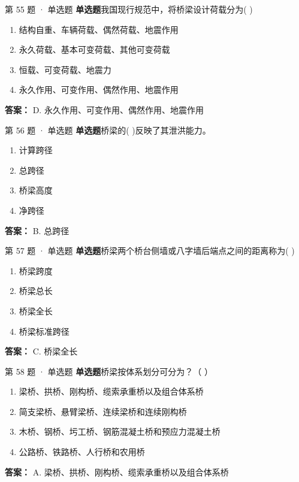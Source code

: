 \documentclass[UTF8,zihao=-4,openany]{ctexbook}
\newenvironment{choices}{\begin{enumerate}[label=\Alph*.,leftmargin=9mm,labelsep=3mm,itemsep=2pt,topsep=4pt]}{\end{enumerate}}
\newcommand{\qtype}[1]{\textcolor{brand}{\sffamily\bfseries #1}}
\begin{document}
\begin{questionbox}{第 55 题 · 单选题}
\qtype{单选题}\quad 我国现行规范中，将桥梁设计荷载分为( )
\begin{choices}
\item 结构自重、车辆荷载、偶然荷载、地震作用
\item 永久荷载、基本可变荷载、其他可变荷载
\item 恒载、可变荷载、地震力
\item 永久作用、可变作用、偶然作用、地震作用
\end{choices}
\begin{answerbox}
\textbf{答案：} D. 永久作用、可变作用、偶然作用、地震作用
\end{answerbox}
\end{questionbox}

\begin{questionbox}{第 56 题 · 单选题}
\qtype{单选题}\quad 桥梁的( )反映了其泄洪能力。
\begin{choices}
\item 计算跨径
\item 总跨径
\item 桥梁高度
\item 净跨径
\end{choices}
\begin{answerbox}
\textbf{答案：} B. 总跨径
\end{answerbox}
\end{questionbox}

\begin{questionbox}{第 57 题 · 单选题}
\qtype{单选题}\quad 桥梁两个桥台侧墙或八字墙后端点之间的距离称为( )
\begin{choices}
\item 桥梁跨度
\item 桥梁总长
\item 桥梁全长
\item 桥梁标准跨径
\end{choices}
\begin{answerbox}
\textbf{答案：} C. 桥梁全长
\end{answerbox}
\end{questionbox}

\begin{questionbox}{第 58 题 · 单选题}
\qtype{单选题}\quad 桥梁按体系划分可分为？（ ）
\begin{choices}
\item 梁桥、拱桥、刚构桥、缆索承重桥以及组合体系桥
\item 简支梁桥、悬臂梁桥、连续梁桥和连续刚构桥
\item 木桥、钢桥、圬工桥、钢筋混凝土桥和预应力混凝土桥
\item 公路桥、铁路桥、人行桥和农用桥
\end{choices}
\begin{answerbox}
\textbf{答案：} A. 梁桥、拱桥、刚构桥、缆索承重桥以及组合体系桥
\end{answerbox}
\end{questionbox}
\end{document}
